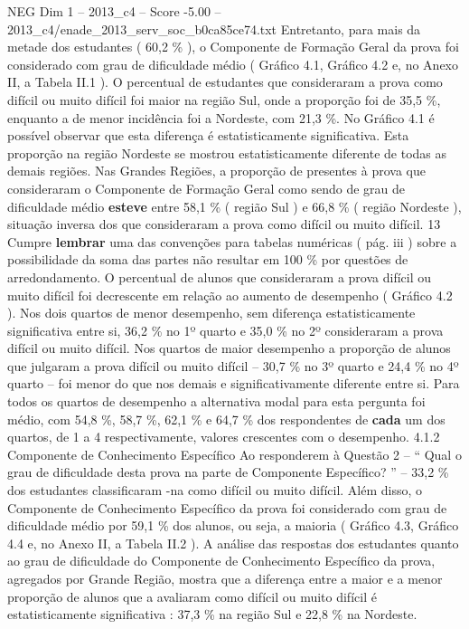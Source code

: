 \begin{textsample}{NEG Dim 1 – 2013\_c4 – Score -5.00 – 2013\_c4/enade\_2013\_serv\_soc\_b0ca85ce74.txt}
Entretanto, para mais da metade dos estudantes ( 60,2 \% ), o Componente de Formação Geral da prova foi considerado com grau de dificuldade médio ( Gráfico 4.1, Gráfico 4.2 e, no Anexo II, a Tabela II.1 ).
O percentual de estudantes que consideraram a prova como difícil ou muito difícil foi maior na região Sul, onde a proporção foi de 35,5 \%, enquanto a de menor incidência foi a Nordeste, com 21,3 \%.
No Gráfico 4.1 é possível observar que esta diferença é estatisticamente significativa.
Esta proporção na região Nordeste se mostrou estatisticamente diferente de todas as demais regiões.
Nas Grandes Regiões, a proporção de presentes à prova que consideraram o Componente de Formação Geral como sendo de grau de dificuldade médio \textbf{esteve} entre 58,1 \% ( região Sul ) e 66,8 \% ( região Nordeste ), situação inversa dos que consideraram a prova como difícil ou muito difícil. 13 Cumpre \textbf{lembrar} uma das convenções para tabelas numéricas ( pág. iii ) sobre a possibilidade da soma das partes não resultar em 100 \% por questões de arredondamento.
O percentual de alunos que consideraram a prova difícil ou muito difícil foi decrescente em relação ao aumento de desempenho ( Gráfico 4.2 ).
Nos dois quartos de menor desempenho, sem diferença estatisticamente significativa entre si, 36,2 \% no 1º quarto e 35,0 \% no 2º consideraram a prova difícil ou muito difícil.
Nos quartos de maior desempenho a proporção de alunos que julgaram a prova difícil ou muito difícil – 30,7 \% no 3º quarto e 24,4 \% no 4º quarto – foi menor do que nos demais e significativamente diferente entre si.
Para todos os quartos de desempenho a alternativa modal para esta pergunta foi médio, com 54,8 \%, 58,7 \%, 62,1 \% e 64,7 \% dos respondentes de \textbf{cada} um dos quartos, de 1 a 4 respectivamente, valores crescentes com o desempenho. 4.1.2 Componente de Conhecimento Específico Ao responderem à Questão 2 – “ Qual o grau de dificuldade desta prova na parte de Componente Específico? ” – 33,2 \% dos estudantes classificaram -na como difícil ou muito difícil.
Além disso, o Componente de Conhecimento Específico da prova foi considerado com grau de dificuldade médio por 59,1 \% dos alunos, ou seja, a maioria ( Gráfico 4.3, Gráfico 4.4 e, no Anexo II, a Tabela II.2 ).
A análise das respostas dos estudantes quanto ao grau de dificuldade do Componente de Conhecimento Específico da prova, agregados por Grande Região, mostra que a diferença entre a maior e a menor proporção de alunos que a avaliaram como difícil ou muito difícil é estatisticamente significativa : 37,3 \% na região Sul e 22,8 \% na Nordeste.

\end{textsample}
